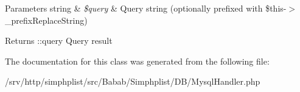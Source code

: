 \begin{DoxyParams}[1]{Parameters}
string & {\em \$query} & Query string (optionally prefixed with \$this-\/$>$\+\_\+prefix\+Replace\+String) \\
\hline
\end{DoxyParams}
\begin{DoxyReturn}{Returns}
\+::query Query result 
\end{DoxyReturn}


The documentation for this class was generated from the following file\+:\begin{DoxyCompactItemize}
\item 
/srv/http/simphplist/src/\+Babab/\+Simphplist/\+D\+B/Mysql\+Handler.\+php\end{DoxyCompactItemize}
